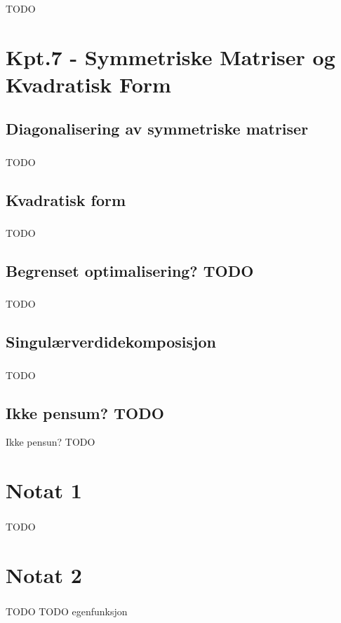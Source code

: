 \documentclass{article}
\begin{document}
      \subsubsection{}
        TODO
  \section{Kpt.7 - Symmetriske Matriser og Kvadratisk Form}
    \subsection{Diagonalisering av symmetriske matriser}
      \subsubsection{}
        TODO
    \subsection{Kvadratisk form}
      \subsubsection{}
        TODO
    \subsection{Begrenset optimalisering? TODO}
      \subsubsection{}
        TODO
    \subsection{Singulærverdidekomposisjon}
      \subsubsection{}
        TODO
    \subsection{Ikke pensum? TODO}
      Ikke pensun? TODO
  \section{Notat 1}
    \subsubsection{}
      TODO
  \section{Notat 2}
    \subsubsection{}
      TODO
  TODO egenfunksjon
\end{document}

